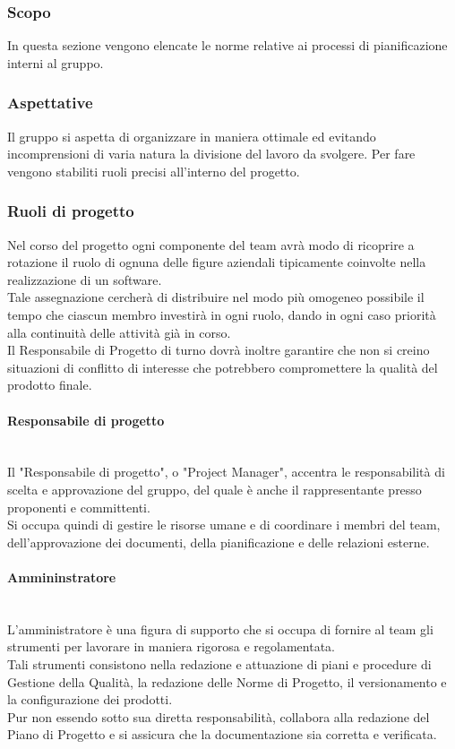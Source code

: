 \subsubsection{Scopo}
In questa sezione vengono elencate le norme relative ai processi di pianificazione interni al gruppo.
\subsubsection{Aspettative}
Il gruppo si aspetta di organizzare in maniera ottimale ed evitando incomprensioni di varia natura la divisione del lavoro da svolgere. Per fare vengono stabiliti ruoli precisi all'interno del progetto.


\subsubsection{Ruoli di progetto}
Nel corso del progetto ogni componente del team avrà modo di ricoprire a rotazione il ruolo di ognuna delle figure aziendali tipicamente coinvolte nella realizzazione di un software.
\\Tale assegnazione cercherà di distribuire nel modo più omogeneo possibile il tempo che ciascun membro investirà in ogni ruolo, dando in ogni caso priorità alla continuità delle attività già in corso.
\\Il Responsabile di Progetto di turno dovrà inoltre garantire che non si creino situazioni di conflitto di interesse che potrebbero compromettere la qualità del prodotto finale.
    \paragraph{Responsabile di progetto}
    ~\\Il "Responsabile di progetto", o "Project Manager", accentra le responsabilità di scelta e approvazione del gruppo, del quale è anche il rappresentante presso proponenti e committenti.
    \\Si occupa quindi di gestire le risorse umane e di coordinare i membri del team, dell'approvazione dei documenti, della pianificazione e delle relazioni esterne.
    \paragraph{Ammininstratore}
    ~\\L'amministratore è una figura di supporto che si occupa di fornire al team gli strumenti per lavorare in maniera rigorosa e regolamentata.
    \\Tali strumenti consistono nella redazione e attuazione di piani e procedure di Gestione della Qualità, la redazione delle Norme di Progetto, il versionamento e la configurazione dei prodotti.
    \\Pur non essendo sotto sua diretta responsabilità, collabora alla redazione del Piano di Progetto e si assicura che la documentazione sia corretta e verificata.
